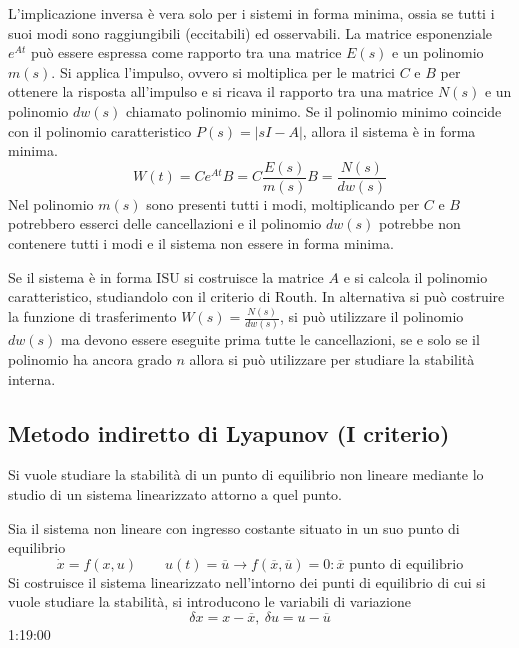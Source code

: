 L'implicazione inversa è vera solo per i sistemi in forma minima, ossia se
tutti i suoi modi sono raggiungibili (eccitabili) ed osservabili.
La matrice esponenziale $e^{At}$ può essere espressa come rapporto tra una
matrice $E(s)$ e un polinomio $m(s)$. Si applica l'impulso, ovvero si
moltiplica per le matrici $C$ e $B$ per ottenere la risposta all'impulso e si
ricava il rapporto tra una matrice $N(s)$ e un polinomio $dw(s)$ chiamato
polinomio minimo. Se il polinomio minimo coincide con il polinomio
caratteristico $P(s)=|sI-A|$, allora il sistema è in forma minima.
$$
W(t)  = Ce^{At}B = C\frac{E(s)}{m(s)}B = \frac{N(s)}{dw(s)}
$$
Nel polinomio $m(s)$ sono presenti tutti i modi, moltiplicando per $C$ e $B$
potrebbero esserci delle cancellazioni e il polinomio $dw(s)$ potrebbe non
contenere tutti i modi e il sistema non essere in forma minima.

Se il sistema è in forma ISU si costruisce la matrice $A$ e si calcola il
polinomio caratteristico, studiandolo con il criterio di Routh.
In alternativa si può costruire la funzione di trasferimento
$W(s)=\frac{N(s)}{dw(s)}$, si può utilizzare il polinomio $dw(s)$ ma devono
essere eseguite prima tutte le cancellazioni, se e solo se il polinomio ha
ancora grado $n$ allora si può utilizzare per studiare la stabilità interna.

\subsection{Metodo indiretto di Lyapunov (I criterio)}
Si vuole studiare la stabilità di un punto di equilibrio non lineare mediante
lo studio di un sistema linearizzato attorno a quel punto.

Sia il sistema non lineare con ingresso costante situato in un suo punto di
equilibrio
$$
\dot{x} =f(x,u) \qquad u(t) = \overline{u} \longrightarrow
f(\overline{x},\overline{u})=0 : \overline{x} \text{ punto di equilibrio}
$$
Si costruisce il sistema linearizzato nell'intorno dei punti di equilibrio di
cui si vuole studiare la stabilità, si introducono le variabili di variazione
$$
\delta x = x-\overline{x},\ \delta u = u - \overline{u}
$$
1:19:00
